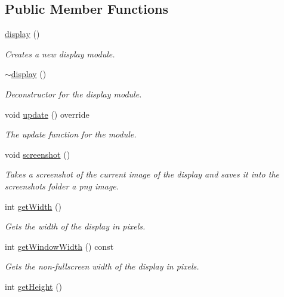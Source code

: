 \subsection*{Public Member Functions}
\begin{DoxyCompactItemize}
\item 
\hyperlink{classflounder_1_1display_ac0a3910222a928f1fc60193cd65c0530}{display} ()
\begin{DoxyCompactList}\small\item\em Creates a new display module. \end{DoxyCompactList}\item 
\hyperlink{classflounder_1_1display_a272f9080af9079cbb3890b18c3e4d394}{$\sim$display} ()
\begin{DoxyCompactList}\small\item\em Deconstructor for the display module. \end{DoxyCompactList}\item 
void \hyperlink{classflounder_1_1display_a799c6a76fcac1a0ca56dfd6b8d7993fa}{update} () override
\begin{DoxyCompactList}\small\item\em The update function for the module. \end{DoxyCompactList}\item 
void \hyperlink{classflounder_1_1display_af27b3f93977c32c79ad9522672e484c5}{screenshot} ()
\begin{DoxyCompactList}\small\item\em Takes a screenshot of the current image of the display and saves it into the screenshots folder a png image. \end{DoxyCompactList}\item 
int \hyperlink{classflounder_1_1display_a4e10a13f95b11b003311f96abdc8c7ba}{get\+Width} ()
\begin{DoxyCompactList}\small\item\em Gets the width of the display in pixels. \end{DoxyCompactList}\item 
int \hyperlink{classflounder_1_1display_ae0b1039d92aa73d05a9b5791dceaa7d6}{get\+Window\+Width} () const
\begin{DoxyCompactList}\small\item\em Gets the non-\/fullscreen width of the display in pixels. \end{DoxyCompactList}\item 
int \hyperlink{classflounder_1_1display_a93c0ecfc2d7fdca87f881f0989a001a9}{get\+Height} ()

\end{DoxyCompactItemize}
